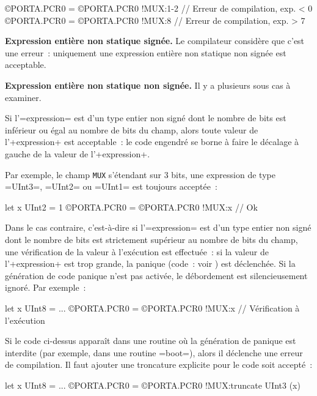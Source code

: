 \begin{OMNIBUS}
©PORTA.PCR0 = {©PORTA.PCR0 !MUX:1-2} // Erreur de compilation, exp. < 0
©PORTA.PCR0 = {©PORTA.PCR0 !MUX:8} // Erreur de compilation, exp. > 7
\end{OMNIBUS}

{\bf Expression entière non statique signée.} Le compilateur considère que c'est une erreur~: uniquement une expression entière non statique non signée est acceptable.


{\bf Expression entière non statique non signée.} Il y a plusieurs sous cas à examiner.

Si l'\omnibus=expression= est d'un type entier non signé dont le nombre de bits est inférieur ou égal au nombre de bits du champ, alors toute valeur de l'\omnibus+expression+ est acceptable~: le code engendré se borne à faire le décalage à gauche de la valeur de l'\omnibus+expression+.

Par exemple, le champ \texttt{MUX} s'étendant sur $3$ bits, une expression de type \omnibus=UInt3=, \omnibus=UInt2= ou \omnibus=UInt1= est toujours acceptée~:

\begin{OMNIBUS}
let x UInt2 = 1
©PORTA.PCR0 = {©PORTA.PCR0 !MUX:x} // Ok
\end{OMNIBUS}

Dans le cas contraire, c'est-à-dire si l'\omnibus=expression= est d'un type entier non signé dont le nombre de bits est strictement supérieur au nombre de bits du champ, une vérification de la valeur à l'exécution est effectuée~: si la valeur de l'\omnibus+expression+ est trop grande, la panique (code~: voir ) est déclenchée. Si la génération de code panique n'est pas activée, le débordement est silencieusement ignoré. Par exemple~:

\begin{OMNIBUS}
let x UInt8 = ...
©PORTA.PCR0 = {©PORTA.PCR0 !MUX:x} // Vérification à l'exécution
\end{OMNIBUS}

Si le code ci-dessus apparaît dans une routine où la génération de panique est interdite (par exemple, dans une routine \omnibus=boot=), alors il déclenche une erreur de compilation. Il faut ajouter une troncature explicite pour le code soit accepté~:

\begin{OMNIBUS}
let x UInt8 = ...
©PORTA.PCR0 = {©PORTA.PCR0 !MUX:truncate UInt3 (x)}
\end{OMNIBUS}


